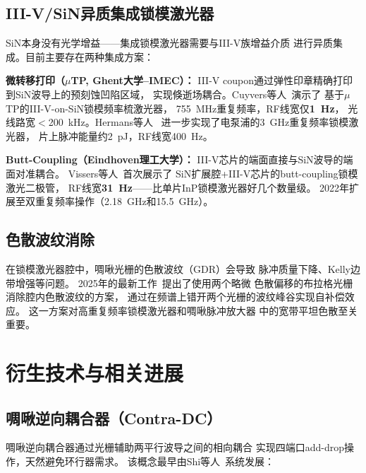 \documentclass[12pt,a4paper,twoside]{article}
\begin{document}
\subsection{III-V/SiN异质集成锁模激光器}

SiN本身没有光学增益——集成锁模激光器需要与III-V族增益介质
进行异质集成。目前主要存在两种集成方案：

\textbf{微转移打印（$\mu$TP, Ghent大学--IMEC）：}
III-V coupon通过弹性印章精确打印到SiN波导上的预刻蚀凹陷区域，
实现倏逝场耦合。Cuyvers等人~\cite{cuyvers2021}演示了
基于$\mu$TP的III-V-on-SiN锁模频率梳激光器，
755~MHz重复频率，RF线宽仅\textbf{1~Hz}，
光线路宽$<$200~kHz。Hermans等人~\cite{hermans2021}
进一步实现了电泵浦的3~GHz重复频率锁模激光器，
片上脉冲能量约2~pJ，RF线宽400~Hz。

\textbf{Butt-Coupling（Eindhoven理工大学）：}
III-V芯片的端面直接与SiN波导的端面对准耦合。
Vissers等人~\cite{vissers2021}首次展示了
SiN扩展腔+III-V芯片的butt-coupling锁模激光二极管，
RF线宽\textbf{31~Hz}——比单片InP锁模激光器好几个数量级。
2022年扩展至双重复频率操作（2.18~GHz和15.5~GHz）。

\subsection{色散波纹消除}

在锁模激光器腔中，啁啾光栅的色散波纹（GDR）会导致
脉冲质量下降、Kelly边带增强等问题。
2025年的最新工作~\cite{ripple2025}提出了使用两个略微
色散偏移的布拉格光栅消除腔内色散波纹的方案，
通过在频谱上错开两个光栅的波纹峰谷实现自补偿效应。
这一方案对高重复频率锁模激光器和啁啾脉冲放大器
中的宽带平坦色散至关重要。

\newpage

\section{衍生技术与相关进展}

\subsection{啁啾逆向耦合器（Contra-DC）}

啁啾逆向耦合器通过光栅辅助两平行波导之间的相向耦合
实现四端口add-drop操作，天然避免环行器需求。
该概念最早由Shi等人~\cite{shi2013,shi2014}系统发展：
\end{document}
